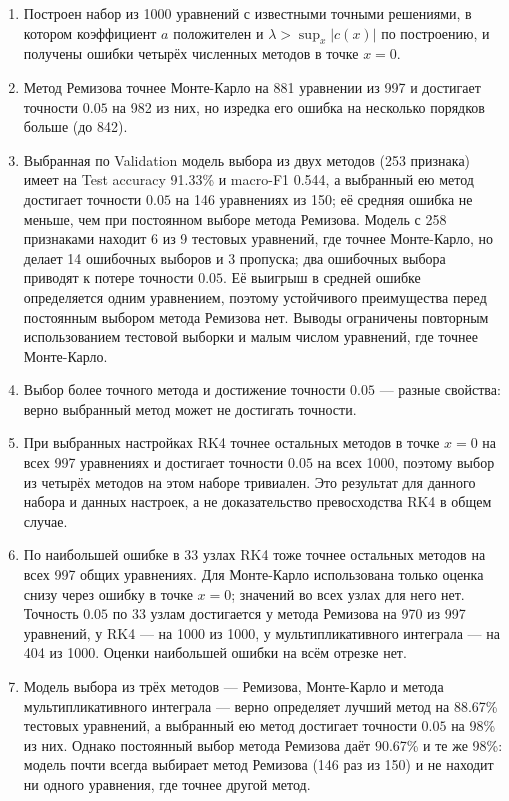 \documentclass[14pt,a4paper]{extarticle}
\begin{document}
\begin{enumerate}
\item Построен набор из 1000 уравнений с известными точными решениями,
в котором коэффициент $a$ положителен и $\lambda>\sup_x|c(x)|$
по построению, и получены ошибки четырёх численных методов в точке
$x=0$.
\item Метод Ремизова точнее Монте-Карло на 881 уравнении из 997
и достигает точности $0.05$ на 982 из них, но изредка его ошибка
на несколько порядков больше (до 842).
\item Выбранная по Validation модель выбора из двух методов
(253 признака) имеет на Test accuracy 91.33\% и macro-F1 0.544, а выбранный
ею метод достигает точности $0.05$ на 146 уравнениях из 150; её средняя
ошибка не меньше, чем при постоянном выборе метода Ремизова. Модель
с 258 признаками находит 6 из 9 тестовых уравнений, где точнее
Монте-Карло, но делает 14 ошибочных выборов и 3 пропуска; два ошибочных
выбора приводят к потере точности $0.05$. Её выигрыш в средней ошибке
определяется одним уравнением, поэтому устойчивого преимущества перед
постоянным выбором метода Ремизова нет. Выводы ограничены повторным
использованием тестовой выборки и малым числом уравнений, где точнее
Монте-Карло.
\item Выбор более точного метода и достижение точности $0.05$ ---
разные свойства: верно выбранный метод может не достигать точности.
\item При выбранных настройках RK4 точнее остальных методов в точке
$x=0$ на всех 997 уравнениях и достигает точности $0.05$ на всех 1000,
поэтому выбор из четырёх методов на этом наборе тривиален. Это результат
для данного набора и данных настроек, а не доказательство превосходства
RK4 в общем случае.
\item По наибольшей ошибке в 33 узлах RK4 тоже точнее остальных
методов на всех 997 общих уравнениях. Для Монте-Карло использована
только оценка снизу через ошибку в точке $x=0$; значений во всех узлах
для него нет. Точность $0.05$ по 33 узлам достигается у метода Ремизова
на 970 из 997 уравнений, у RK4 --- на 1000 из 1000, у мультипликативного
интеграла --- на 404 из 1000. Оценки наибольшей ошибки на всём отрезке
нет.
\item Модель выбора из трёх методов --- Ремизова, Монте-Карло и метода
мультипликативного интеграла --- верно определяет лучший метод
на 88.67\% тестовых уравнений, а выбранный ею метод достигает точности $0.05$
на 98\% из них. Однако постоянный выбор метода Ремизова даёт 90.67\%
и те же 98\%: модель почти всегда выбирает метод Ремизова (146 раз
из 150) и не находит ни одного уравнения, где точнее другой метод.


\end{enumerate}
\end{document}

